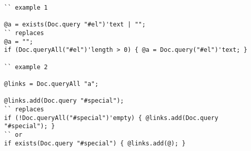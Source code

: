 \begin{sourcecode}
\label{maxlimitsheet}
\begin{verbatim}
`` example 1

@a = exists(Doc.query "#el")'text | "";
`` replaces
@a = "";
if (Doc.queryAll("#el")'length > 0) { @a = Doc.query("#el")'text; }

`` example 2

@links = Doc.queryAll "a";

@links.add(Doc.query "#special");
`` replaces
if (!Doc.queryAll("#special")'empty) { @links.add(Doc.query "#special"); }
`` or
if exists(Doc.query "#special") { @links.add(@); }
\end{verbatim}
\end{sourcecode}


